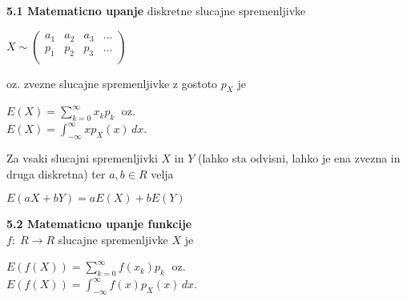 \documentclass{article}
\begin{document}
\begin{multicols}{3}
\textbf{5.1 Matematicno upanje} diskretne slucajne spremenljivke
\begin{center}
    \begin{small}
        \begin{math}
            X \sim
            \begin{pmatrix}
                a_{1} & a_{2} & a_{3} & \dots \\
                p_{1} & p_{2} & p_{3} & \dots \\
            \end{pmatrix}
        \end{math}
    \end{small}
\end{center}
oz. zvezne slucajne spremenljivke z gostoto $p_X$ je
\begin{center}
    \begin{math}
        E(X) = \sum_{k=0}^{\infty} x_k p_k\;
    \end{math} oz.\\
    \begin{math}
        E(X) = \int_{- \infty}^{ \infty} x p_X(x)\, dx
    \end{math}.
\end{center}
Za vsaki slucajni spremenljivki $X$ in $Y$ (lahko sta odvisni, lahko je ena zvezna in druga diskretna)
ter $a, b \in R$ velja 
\begin{center}
    \begin{math}
        E(aX + bY) = aE(X) + bE(Y)
    \end{math}        
\end{center}

\textbf{5.2 Matematicno upanje funkcije}\\
$f:\; R \rightarrow R$ slucajne spremenljivke $X$ je
\begin{center}
    \begin{math}
        E(f(X)) = \sum_{k=0}^{\infty} f(x_k) p_k\;
    \end{math} oz.\\
    \begin{math}
        E(f(X)) = \int_{- \infty}^{ \infty} f(x) p_X (x)\, dx
    \end{math}.
\end{center}


\end{multicols}
\end{document}
